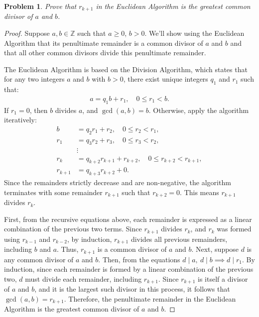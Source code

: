 \documentclass[12pt]{article}
\newtheorem{problem}{Problem}
\theoremstyle{remark}  %
\begin{document}
    \setcounter{problem}{2}
    \begin{problem}
        Prove that $r_{k+1}$ in the Euclidean Algorithm is the greatest common divisor of $a$ and $b$.
    \end{problem}
    \begin{proof}
        Suppose $a,b\in\mathbb{Z}$ such that $a\geq 0$, $b>0$. We'll show using the Euclidean Algorithm that its penultimate remainder is a common divisor of $a$ and $b$ and that all other common divisors divide this penultimate remainder.

        The Euclidean Algorithm is based on the Division Algorithm, which states that for any two integers $a$ and $b$ with $b > 0$, there exist unique integers $q_1$ and $r_1$ such that:
        \begin{align*}
            a = q_1 b + r_1, \quad 0 \leq r_1 < b.
        \end{align*}
        If $r_1 = 0$, then $b$ divides $a$, and $\gcd(a, b) = b$. Otherwise, apply the algorithm iteratively:
        \begin{align*}
            b &= q_2 r_1 + r_2, \quad 0 \leq r_2 < r_1, \\
            r_1 &= q_3 r_2 + r_3, \quad 0 \leq r_3 < r_2, \\
            &\vdots \\
            r_k &= q_{k+2} r_{k+1} + r_{k+2}, \quad 0 \leq r_{k+2} < r_{k+1}, \\
            r_{k+1} &= q_{k+3} r_{k+2} + 0.
        \end{align*}
        Since the remainders strictly decrease and are non-negative, the algorithm terminates with some remainder $r_{k+1}$ such that $r_{k+2} = 0$. This means $r_{k+1}$ divides $r_k$.
        
        First, from the recursive equations above, each remainder is expressed as a linear combination of the previous two terms. Since $r_{k+1}$ divides $r_k$, and $r_k$ was formed using $r_{k-1}$ and $r_{k-2}$, by induction, $r_{k+1}$ divides all previous remainders, including $b$ and $a$. Thus, $r_{k+1}$ is a common divisor of $a$ and $b$. Next, suppose $d$ is any common divisor of $a$ and $b$. Then, from the equations $d \mid a, \ d \mid b \implies d \mid r_1$. By induction, since each remainder is formed by a linear combination of the previous two, $d$ must divide each remainder, including $r_{k+1}$. Since $r_{k+1}$ is itself a divisor of $a$ and $b$, and it is the largest such divisor in this process, it follows that $\gcd(a, b) = r_{k+1}$. Therefore, the penultimate remainder in the Euclidean Algorithm is the greatest common divisor of $a$ and $b$.
    \end{proof}
\end{document}
